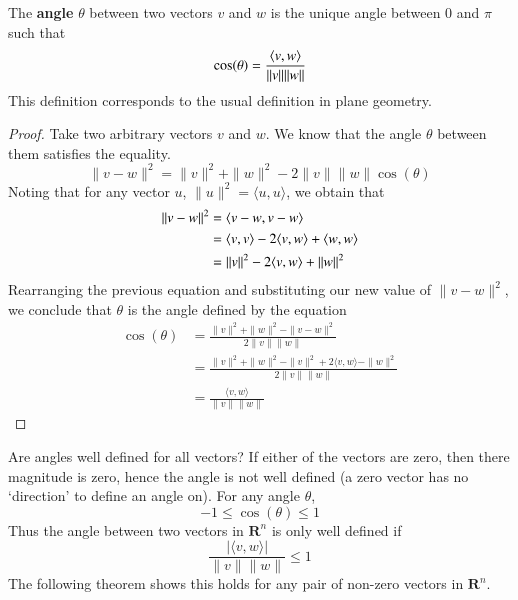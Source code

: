 \begin{theorem}
  The {\bf angle} $\theta$ between two vectors $v$ and $w$ is the unique angle between 0 and $\pi$ such that
  \[ \cos(\theta) = \frac{\langle v, w\rangle}{\| v \| \| w \|} \]
  This definition corresponds to the usual definition in plane geometry.
\end{theorem}
\begin{proof}
  Take two arbitrary vectors $v$ and $w$. We know that the angle $\theta$ between them satisfies the equality.
  \[ \| v - w \|^2 = \|v\|^2 + \|w\|^2 - 2\|v\|\|w\| \cos(\theta) \]
  Noting that for any vector $u$, $\|u\|^2 = \langle u, u \rangle$, we obtain that
  \begin{align*}
    \|v - w\|^2 &= \langle v - w, v - w\rangle\\
                &= \langle v, v\rangle - 2 \langle v, w\rangle + \langle w, w\rangle\\
                &= \|v\|^2 - 2 \langle v, w\rangle + \|w\|^2
  \end{align*}
  Rearranging the previous equation and substituting our new value of $\|v - w\|^2$, we conclude that $\theta$ is the angle defined by the equation
  \begin{align*}
    \cos(\theta) &= \frac{\|v\|^2 + \|w\|^2 - \|v - w\|^2}{2\|v\|\|w\|}\\
                 &= \frac{\|v\|^2 + \|w\|^2 - \|v\|^2 + 2\langle v, w \rangle - \|w\|^2}{2\|v\|\|w\|}\\
                 &= \frac{\langle v, w \rangle}{\|v\|\|w\|}
  \end{align*}
\end{proof}

Are angles well defined for all vectors? If either of the vectors are zero, then there magnitude is zero, hence the angle is not well defined (a zero vector has no `direction' to define an angle on). For any angle $\theta$,
%
\[ -1 \leq \cos(\theta) \leq 1 \]
%
Thus the angle between two vectors in $\mathbf{R}^n$ is only well defined if
%
\[ \frac{|\langle v, w \rangle|}{\|v\|\|w\|} \leq 1\]
%
The following theorem shows this holds for any pair of non-zero vectors in $\mathbf{R}^n$.


